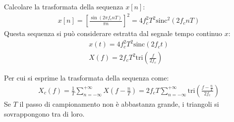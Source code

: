 \documentclass{article}
\newcommand{\sinc}{\mathrm{sinc}}
\newcommand{\tri}{\mathrm{tri}}
\begin{document}
Calcolare la trasformata della sequenza $x[n]$:
\begin{gather*}
    x[n]=\left[\displaystyle\frac{\sin(2\pi f_cnT)}{\pi n}\right]^2=4f_c^2T^2\sinc^2(2f_cnT)
\end{gather*}
Questa sequenza si può considerare estratta dal segnale tempo continuo $x$:
\begin{gather*}
    x(t)=4f_c^2T^2\sinc(2f_ct)\\
    X(f)=\displaystyle 2f_cT^2\tri \left(\frac{f}{2f_c}\right)
\end{gather*}

Per cui si esprime la trasformata della sequenza come:
\begin{gather}
    X_c(f)=\displaystyle\frac{1}{T}\sum_{n=-\infty}^{+\infty}X\left(f-\frac{n}{T}\right)=2f_cT\sum_{n=-\infty}^{+\infty}\tri \left(\frac{f-\frac{n}{T}}{2f_c}\right)
\end{gather}
Se $T$ il passo di campionamento non è abbastanza grande, i triangoli si sovrappongono tra di loro. 
\end{document}
